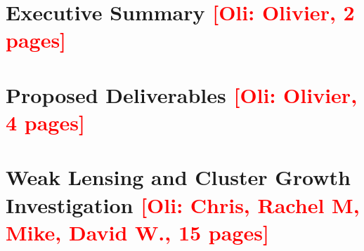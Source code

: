 \documentclass[letter]{ar-1col_WFIRST-HLS}
\newcommand{\Oli}[1]{\textcolor{red}{[{\bf Oli}: #1]}}
\begin{document}



\tableofcontents
\thispagestyle{empty}

\newpage
{}

\section{Executive Summary \Oli{Olivier, 2 pages}}
\label{sec:executive_summary}



\section{Proposed Deliverables \Oli{Olivier, 4 pages}}
\label{sec:deliverables}


%

\section{Weak Lensing and Cluster Growth Investigation \Oli{Chris,
    Rachel M, Mike, David W., 15 pages}}
\label{sec:wl_gal-clusters}


\end{document}
